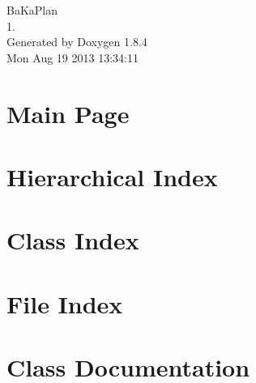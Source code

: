 \documentclass[twoside]{book}
\newcommand{\clearemptydoublepage}{%
  \newpage{\pagestyle{empty}\cleardoublepage}%
}
\begin{document}
\hypersetup{pageanchor=false}
\begin{titlepage}
\vspace*{7cm}
\begin{center}%
{\Large Ba\-Ka\-Plan \\[1ex]\large 1. }\\
\vspace*{1cm}
{\large Generated by Doxygen 1.8.4}\\
\vspace*{0.5cm}
{\small Mon Aug 19 2013 13:34:11}\\
\end{center}
\end{titlepage}
\clearemptydoublepage
\tableofcontents
\clearemptydoublepage
{}
\hypersetup{pageanchor=true}

\chapter{Main Page}
\label{index}\hypertarget{index}{}
\chapter{Hierarchical Index}

\chapter{Class Index}

\chapter{File Index}

\chapter{Class Documentation}

























\end{document}

